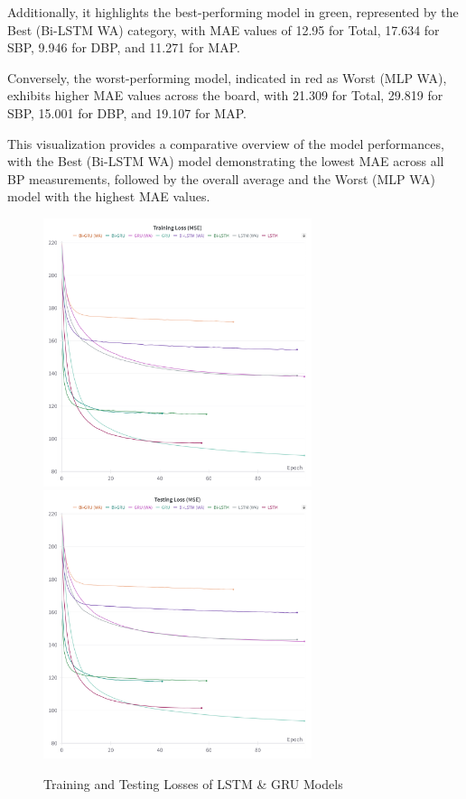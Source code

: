 Additionally, it highlights the best-performing model in green, represented by the Best (Bi-LSTM WA) category, with MAE values of 12.95 for Total, 17.634 for SBP, 9.946 for DBP, and 11.271 for MAP\@.

Conversely, the worst-performing model, indicated in red as Worst (MLP WA), exhibits higher MAE values across the board, with 21.309 for Total, 29.819 for SBP, 15.001 for DBP, and 19.107 for MAP\@.

This visualization provides a comparative overview of the model performances, with the Best (Bi-LSTM WA) model demonstrating the lowest MAE across all BP measurements,
followed by the overall average and the Worst (MLP WA) model with the highest MAE values.

\begin{figure}[p]
    \centering
    \begin{minipage}{\textwidth}
        \centering
        \includegraphics[width=0.7\textwidth]{images/results/training_loss_mse}
        \vspace{0.001cm}
        \includegraphics[width=0.7\textwidth]{images/results/testing_loss_mse}
        \captionsetup{format=plain, justification=centering, font=small}
        \caption{Training and Testing Losses of LSTM \& GRU Models}
        \label{fig:train_test_mse}
    \end{minipage}
\end{figure}

\newpage